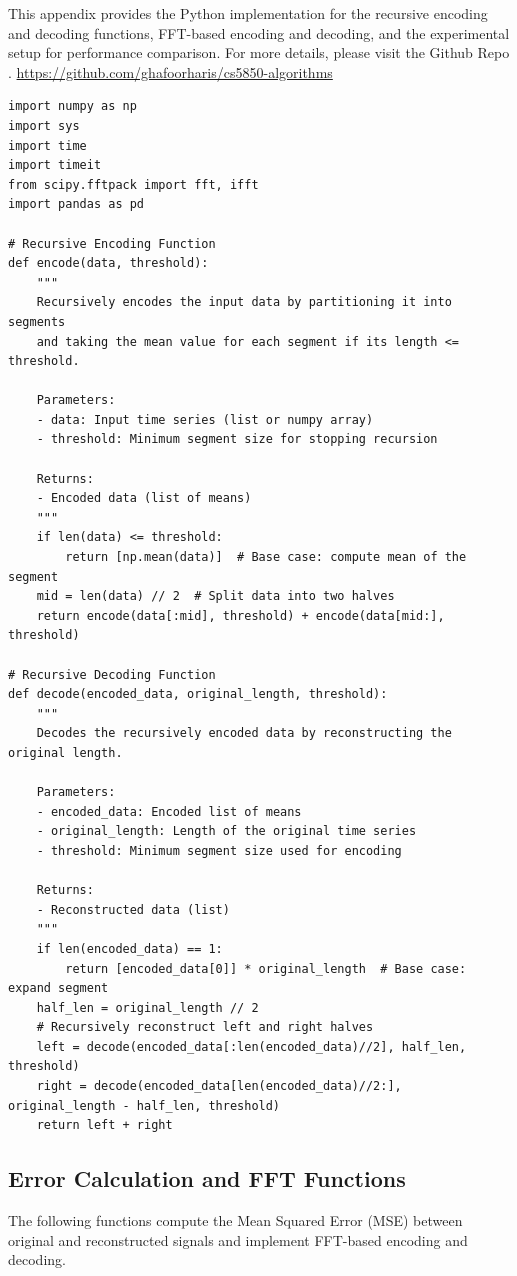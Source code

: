 \documentclass[onecolumn,conference]{IEEEtran}
\begin{document}
This appendix provides the Python implementation for the recursive encoding and decoding functions, FFT-based encoding and decoding, and the experimental setup for performance comparison. For more details, please visit the Github Repo . \href{https://github.com/ghafoorharis/cs5850-algorithms/tree/main/project}{https://github.com/ghafoorharis/cs5850-algorithms}

\begin{verbatim}
import numpy as np
import sys
import time
import timeit
from scipy.fftpack import fft, ifft
import pandas as pd

# Recursive Encoding Function
def encode(data, threshold):
    """
    Recursively encodes the input data by partitioning it into segments
    and taking the mean value for each segment if its length <= threshold.

    Parameters:
    - data: Input time series (list or numpy array)
    - threshold: Minimum segment size for stopping recursion

    Returns:
    - Encoded data (list of means)
    """
    if len(data) <= threshold:
        return [np.mean(data)]  # Base case: compute mean of the segment
    mid = len(data) // 2  # Split data into two halves
    return encode(data[:mid], threshold) + encode(data[mid:], threshold)

# Recursive Decoding Function
def decode(encoded_data, original_length, threshold):
    """
    Decodes the recursively encoded data by reconstructing the original length.

    Parameters:
    - encoded_data: Encoded list of means
    - original_length: Length of the original time series
    - threshold: Minimum segment size used for encoding

    Returns:
    - Reconstructed data (list)
    """
    if len(encoded_data) == 1:
        return [encoded_data[0]] * original_length  # Base case: expand segment
    half_len = original_length // 2
    # Recursively reconstruct left and right halves
    left = decode(encoded_data[:len(encoded_data)//2], half_len, threshold)
    right = decode(encoded_data[len(encoded_data)//2:], original_length - half_len, threshold)
    return left + right
\end{verbatim}

\subsection{Error Calculation and FFT Functions}
The following functions compute the Mean Squared Error (MSE) between original and reconstructed signals and implement FFT-based encoding and decoding.
\end{document}
